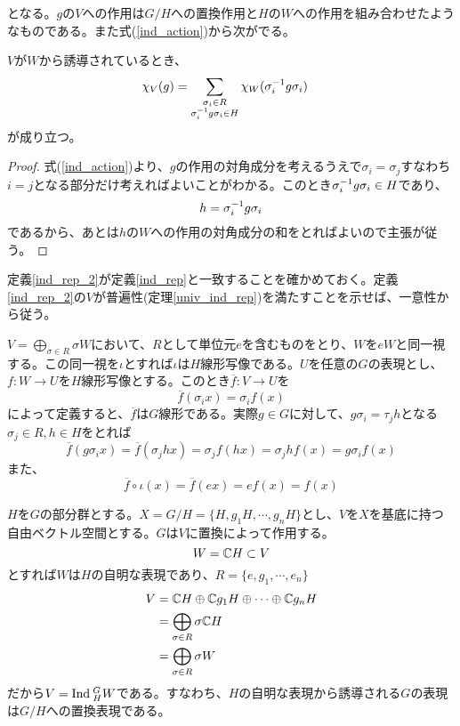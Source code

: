\documentclass{ltjsreport}
\begin{document}
となる。$g$の$V$への作用は$G/H$への置換作用と$H$の$W$への作用を組み合わせたようなものである。また式(\ref{ind_action})から次がでる。

\begin{prop}[誘導表現の指標]\label{ind_char}
  $V$が$W$から誘導されているとき、
  \begin{align}
  \chi_V(g)&=\sum_{\substack{\sigma_i\in R \\ \sigma_i^{-1}g\sigma_i\in H}}\chi_W(\sigma_i^{-1}g\sigma_i)
\end{align}
が成り立つ。
\end{prop}

\begin{proof}
  式(\ref{ind_action})より、$g$の作用の対角成分を考えるうえで$\sigma_i=\sigma_j$すなわち$i=j$となる部分だけ考えればよいことがわかる。このとき$\sigma_i^{-1}g\sigma_i\in H$であり、
  \[
  h=\sigma_i^{-1}g\sigma_i 
  \]
  であるから、あとは$h$の$W$への作用の対角成分の和をとればよいので主張が従う。
\end{proof}

定義\ref{ind_rep_2}が定義\ref{ind_rep}と一致することを確かめておく。定義\ref{ind_rep_2}の$V$が普遍性(定理\ref{univ_ind_rep})を満たすことを示せば、一意性から従う。

$V=\bigoplus_{\sigma\in R}\sigma W$において、$R$として単位元$e$を含むものをとり、$W$を$eW$と同一視する。この同一視を$\iota$とすれば$\iota$は$H$線形写像である。$U$を任意の$G$の表現とし、$f:W\rightarrow U$を$H$線形写像とする。このとき$\overline{f}:V\rightarrow U$を
\[
\overline{f}(\sigma_i x)=\sigma_i f(x)
\]
によって定義すると、$\overline{f}$は$G$線形である。実際$g\in G$に対して、$g\sigma_i =\tau_j h$となる$\sigma_j\in R, h\in H$をとれば
\[
\overline{f}(g\sigma_i x)=\overline{f}(\sigma_j hx)=\sigma_jf(hx)=\sigma_jhf(x)=g\sigma_if(x)  
\]
また、
\[
\overline{f}\circ\iota(x)=\overline{f}(ex)=ef(x)=f(x)  
\]



\begin{eg}\label{ind_from_trivial}
  $H$を$G$の部分群とする。$X=G/H=\{H,g_1H,\cdots,g_nH\}$とし、$V$を$X$を基底に持つ自由ベクトル空間とする。$G$は$V$に置換によって作用する。
  \[
  W=\mathbb{C} H\subset V  
  \]
  とすれば$W$は$H$の自明な表現であり、$R=\{e,g_1,\cdots,e_n\}$
  \begin{align*}
  V&=\mathbb{C} H\oplus \mathbb{C} g_1H\oplus\cdots\oplus\mathbb{C} g_nH\\
  &=\bigoplus_{\sigma\in R}\sigma\mathbb{C} H\\
  &=\bigoplus_{\sigma\in R}\sigma W
  \end{align*}
  だから$V=\text{Ind}\:_H^GW$である。すなわち、$H$の自明な表現から誘導される$G$の表現は$G/H$への置換表現である。
\end{eg}
\end{document}
